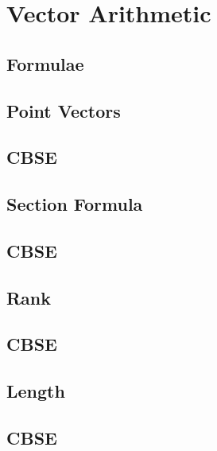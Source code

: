 \documentclass[journal]{IEEEtran}
\begin{document}
\newpage


\tableofcontents

\newpage
\onecolumn


\renewcommand{\thetable}{\theenumi}

\iffalse
\section{Vector Arithmetic}
\subsection{Formulae}

\subsection{Point Vectors}

\subsection{CBSE}

%
\subsection{Section Formula}

\subsection{CBSE}

\subsection{Rank}

\subsection{CBSE}

\subsection{Length}

\subsection{CBSE}

\end{document}
